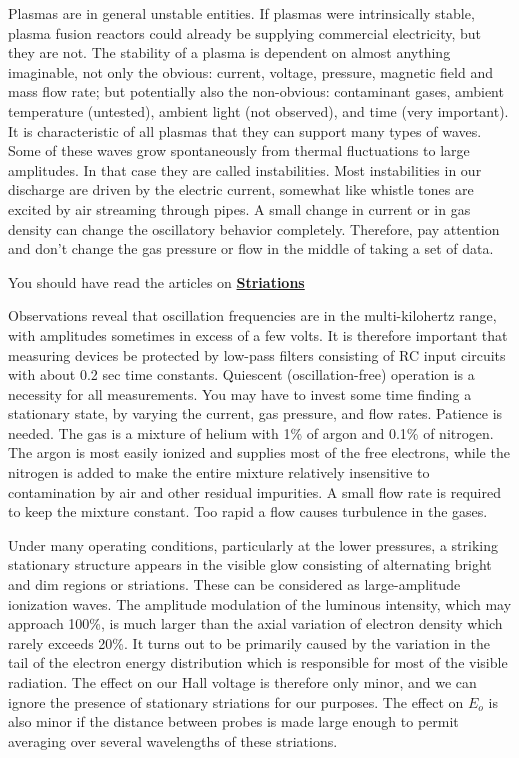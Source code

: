 \documentclass{../lab}
\begin{document}
Plasmas are in general unstable entities. If plasmas were intrinsically stable, plasma fusion reactors could already be supplying commercial electricity, but they are not. The stability of a plasma is dependent on almost anything imaginable, not only the obvious: current, voltage, pressure, magnetic field and mass flow rate; but potentially also the non-obvious: contaminant gases, ambient temperature (untested), ambient light (not observed), and time (very important). It is characteristic of all plasmas that they can support many types of waves. Some of these waves grow spontaneously from thermal fluctuations to large amplitudes. In that case they are called instabilities. Most instabilities in our discharge are driven by the electric current, somewhat like whistle tones are excited by air streaming through pipes. A small change in current or in gas density can change the oscillatory behavior completely. Therefore, pay attention and don’t change the gas pressure or flow in the middle of taking a set of data.

You should have read the articles on \href{https://drive.google.com/file/d/1kD1gMtnRmFsc3hNPE9ed5nFNKpEOKIdx/view?usp=drive_link}{\textbf{Striations}}

Observations reveal that oscillation frequencies are in the multi-kilohertz range, with amplitudes sometimes in excess of a few volts. It is therefore important that measuring devices be protected by low-pass filters consisting of RC input circuits with about 0.2 sec time constants. Quiescent (oscillation-free) operation is a necessity for all measurements. You may have to invest some time finding a stationary state, by varying the current, gas pressure, and flow rates. Patience is needed. The gas is a mixture of helium with 1\% of argon and 0.1\% of nitrogen. The argon is most easily ionized and supplies most of the free electrons, while the nitrogen is added to make the entire mixture relatively insensitive to contamination by air and other residual impurities. A small flow rate is required to keep the mixture constant. Too rapid a flow causes turbulence in the gases.

Under many operating conditions, particularly at the lower pressures, a striking stationary structure appears in the visible glow consisting of alternating bright and dim regions or striations. These can be considered as large-amplitude ionization waves. The amplitude modulation of the luminous intensity, which may approach 100\%, is much larger than the axial variation of electron density which rarely exceeds 20\%. It turns out to be primarily caused by the variation in the tail of the electron energy distribution which is responsible for most of the visible radiation. The effect on our Hall voltage is therefore only minor, and we can ignore the presence of stationary striations for our purposes. The effect on $E_o$ is also minor if the distance between probes is made large enough to permit averaging over several wavelengths of these striations.
\end{document}
